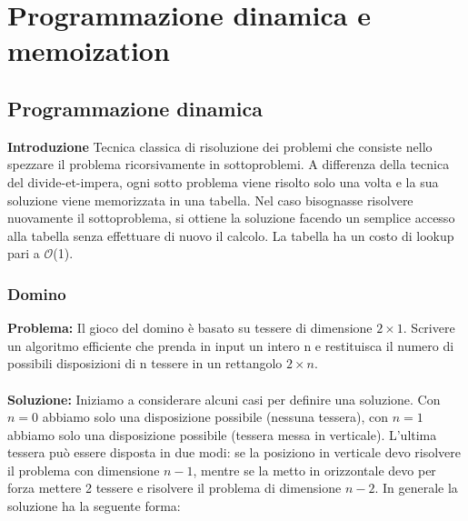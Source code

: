 \documentclass[../cheatSheetAlgoritmi.tex]{subfiles}
\begin{document}
\section{Programmazione dinamica e memoization}
\subsection{Programmazione dinamica}
\textbf{Introduzione} Tecnica classica di risoluzione dei problemi che consiste nello spezzare il problema ricorsivamente in sottoproblemi. A differenza della tecnica del divide-et-impera, ogni sotto problema viene risolto solo una volta e la sua soluzione viene memorizzata in una tabella. Nel caso bisognasse risolvere nuovamente il sottoproblema, si ottiene la soluzione facendo un semplice accesso alla tabella senza effettuare di nuovo il calcolo. La tabella ha un costo di lookup pari a  $\mathcal{O}$(1). 

\subsubsection{Domino}
\textbf{Problema:} Il gioco del domino è basato su tessere di dimensione $2\times1$. Scrivere un algoritmo efficiente che prenda in input un intero n e restituisca il numero di possibili disposizioni di n tessere in un rettangolo $2\times n$. \\\\
\textbf{Soluzione:} Iniziamo a considerare alcuni casi per definire una soluzione. Con $n=0$ abbiamo solo una disposizione possibile (nessuna tessera), con $n=1$ abbiamo solo una disposizione possibile (tessera messa in verticale). L'ultima tessera può essere disposta in due modi: se la posiziono in verticale devo risolvere il problema con dimensione $n-1$, mentre se la metto in orizzontale devo per forza mettere 2 tessere e risolvere il problema di dimensione $n-2$. In generale la soluzione ha la seguente forma: 
\end{document}

